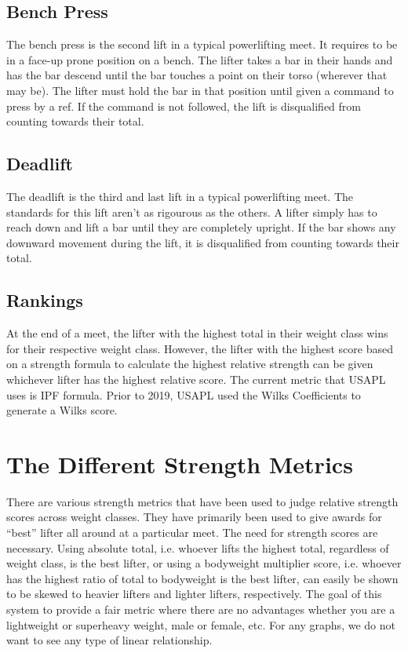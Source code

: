 \documentclass[10pt,letterpaper]{article}
\begin{document}
    \subsection*{Bench Press}
    The bench press is the second lift in a typical powerlifting meet. It requires to be in a face-up prone position on a bench. The lifter takes a bar in their hands and has the bar descend until the bar touches a point on their torso (wherever that may be). The lifter must hold the bar in that position until given a command to press by a ref. If the command is not followed, the lift is disqualified from counting towards their total. 
    \subsection*{Deadlift}
    The deadlift is the third and last lift in a typical powerlifting meet. The standards for this lift aren't as rigourous as the others. A lifter simply has to reach down and lift a bar until they are completely upright. If the bar shows any downward movement during the lift, it is disqualified from counting towards their total.
    \subsection*{Rankings}
    At the end of a meet, the lifter with the highest total in their weight class wins for their respective weight class. However, the lifter with the highest score based on a strength formula to calculate the highest relative strength can be given whichever lifter has the highest relative score. The current metric that USAPL uses is IPF formula. Prior to 2019, USAPL used the Wilks Coefficients to generate a Wilks score.

    \newpage 
    \section{The Different Strength Metrics}
    There are various strength metrics that have been used to judge relative strength scores across weight classes. They have primarily been used to give awards for ``best'' lifter all around at a particular meet. The need for strength scores are necessary. Using absolute total, i.e. whoever lifts the highest total, regardless of weight class, is the best lifter, or using a bodyweight multiplier score, i.e. whoever has the highest ratio of total to bodyweight is the best lifter, can easily be shown to be skewed to heavier lifters and lighter lifters, respectively. The goal of this system to provide a fair metric where there are no advantages whether you are a lightweight or superheavy weight, male or female, etc. For any graphs, we do not want to see any type of linear relationship. 
\end{document}
